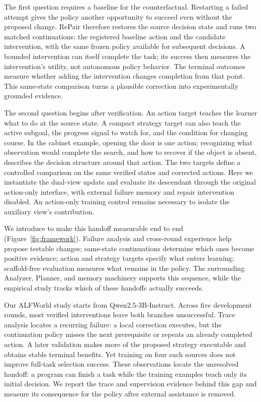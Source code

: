 The first question requires a baseline for the counterfactual. Restarting a
failed attempt gives the policy another opportunity to succeed even without
the proposed change. RePair therefore restores the source decision state and
runs two matched continuations: the registered baseline action and the
candidate intervention, with the same frozen policy available for subsequent
decisions. A bounded intervention can itself complete the task; its success
then measures the intervention's utility, not autonomous policy behavior.
The terminal outcomes measure whether adding the intervention changes
completion from that point. This same-state comparison
turns a plausible correction into experimentally grounded evidence.

The second question begins after verification. An action target teaches the
learner what to do at the source state. A compact strategy target can also
teach the active subgoal, the progress signal to watch for, and the condition
for changing course. In the cabinet example, opening the door is one action;
recognizing what observation would complete the search, and how to recover if
the object is absent, describes the decision structure around that action.
The two targets define a controlled comparison on the same verified states
and corrected actions. Here we instantiate the dual-view update and evaluate
its descendant through the original action-only interface, with external
failure memory and repair intervention disabled. An action-only training
control remains necessary to isolate the auxiliary view's contribution.

We introduce \method{} to make this handoff measurable end to end
(Figure~\ref{fig:framework}). Failure analysis and cross-round experience
help propose testable changes; same-state continuations determine which ones
become positive evidence; action and strategy targets specify
what enters learning; scaffold-free evaluation measures what remains in the
policy. The surrounding Analyzer, Planner, and
memory machinery supports this sequence, while the empirical study tracks
which of these handoffs actually succeeds.

Our ALFWorld study starts from Qwen2.5-3B-Instruct. Across five development
rounds, most verified interventions leave both branches unsuccessful.
Trace analysis locates a recurring failure: a local correction executes,
but the continuation policy misses the next prerequisite or repeats an
already completed action. A later validation makes more of the proposed
strategy executable and obtains stable terminal benefits. Yet training on
four such sources does not improve full-task selection success. These
observations locate the unresolved handoff: a program can finish a task
while the training examples teach only its initial decision. We report
the trace and supervision evidence behind this gap and measure its
consequence for the policy after external assistance is removed.
